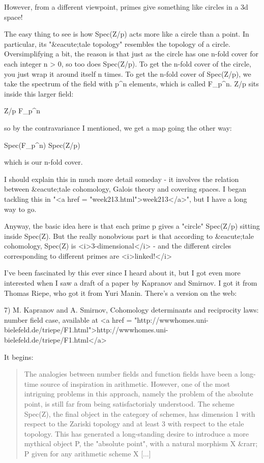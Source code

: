 However, from a different viewpoint, primes give something like
circles in a 3d space!

The easy thing to see is how Spec(Z/p) acts more like a circle than a point.
In particular, its "&eacute;tale topology" resembles the topology of a
circle.  Oversimplifying a bit, the reason is that just as the circle
has one n-fold cover for each integer n > 0, so too does Spec(Z/p).
To get the n-fold cover of the circle, you just wrap it around itself
n times.  To get the n-fold cover of Spec(Z/p), we take the spectrum
of the field with p^{n} elements, which is called
F_{p^{n}}.  Z/p sits inside this larger field:

Z/p \to  F_{p^{n}}

so by the contravariance I mentioned, we get a map going the
other way:

Spec(F_{p^{n}}) \to  Spec(Z/p)

which is our n-fold cover.

I should explain this in much more detail someday - it involves
the relation between &eacute;tale cohomology, Galois theory and
covering spaces.  I began tackling this in 
"<a href = "week213.html">week213</a>", but I have a long
way to go.

Anyway, the basic idea here is that each prime p gives a "circle" 
Spec(Z/p) sitting inside Spec(Z).  
But the really nonobvious part is that according to &eacute;tale
cohomology, Spec(Z) is <i>3-dimensional</i> - and the different circles
corresponding to different primes are <i>linked!</i>

I've been fascinated by this ever since I heard about it, but I
got even more interested when I saw a draft of a paper by 
Kapranov and Smirnov.  I got it from Thomas Riepe, who got
it from Yuri Manin.  There's a version on the web:

7) M. Kapranov and A. Smirnov, Cohomology determinants and
reciprocity laws: number field case, available at
<a href = "http://wwwhomes.uni-bielefeld.de/triepe/F1.html">http://wwwhomes.uni-bielefeld.de/triepe/F1.html</a>

It begins:

\begin{quote}
     The analogies between number fields and function fields
     have been a long-time source of inspiration in arithmetic.
     However, one of the most intriguing problems in this
     approach, namely the problem of the absolute point, is
     still far from being satisfactorialy understood.  The
     scheme Spec(Z), the final object in the category of schemes,
     has dimension 1 with respect to the Zariski topology
     and at least 3 with respect to the etale topology.  This
     has generated a long-standing desire to introduce a more
     mythical object P, the "absolute point", with a natural
     morphism X &rarr; P given for any arithmetic scheme X [...]
\end{quote}
    

